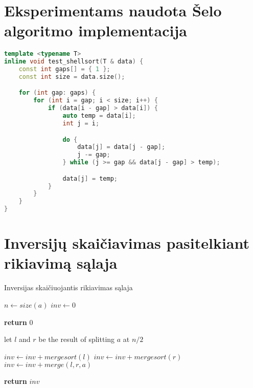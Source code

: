 \documentclass{VUMIFInfBakalaurinis}
\begin{document}





\printbibliography[heading=bibintoc]

\appendix  %

\section{Eksperimentams naudota Šelo algoritmo implementacija}

\begin{lstlisting}[label={alg:test_shellsort},language=C++]
template <typename T>
inline void test_shellsort(T & data) {
    const int gaps[] = { 1 };
    const int size = data.size();

    for (int gap: gaps) {
        for (int i = gap; i < size; i++) {
            if (data[i - gap] > data[i]) {
                auto temp = data[i];
                int j = i;

                do {
                    data[j] = data[j - gap];
                    j -= gap;
                } while (j >= gap && data[j - gap] > temp);

                data[j] = temp;
            }
        }
    }
}
\end{lstlisting}

\section{Inversijų skaičiavimas pasitelkiant rikiavimą sąlaja}

\begin{algorithm}[H]
  \caption{Inversijas skaičiuojantis rikiavimas sąlaja}\label{alg:merge_sort}
  \begin{algorithmic}[1]
      \State $n \gets size(a)$
      \State $inv \gets 0$
      
        \State \textbf{return} $0$ 
      \EndIf

      \State let $l$ and $r$ be the result of splitting $a$ at $n/2$

      \State $inv \gets inv + mergesort(l)$
      \State $inv \gets inv + mergesort(r)$
      \State $inv \gets inv + merge(l,r,a)$

      \State \textbf{return} $inv$ 

    \EndProcedure
  \end{algorithmic}
\end{algorithm}
\end{document}
